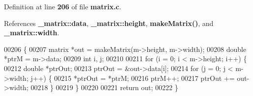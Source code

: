 Definition at line \textbf{ 206} of file \textbf{ matrix.\+c}.



References \textbf{ \+\_\+matrix\+::data}, \textbf{ \+\_\+matrix\+::height}, \textbf{ make\+Matrix()}, and \textbf{ \+\_\+matrix\+::width}.


\begin{DoxyCode}
00206                                    \{
00207   matrix *out = makeMatrix(m->height, m->width);
00208   \textcolor{keywordtype}{double} *ptrM = m->data;
00209   \textcolor{keywordtype}{int} i, j;
00210 
00211   \textcolor{keywordflow}{for} (i = 0; i < m->height; i++) \{
00212     \textcolor{keywordtype}{double} *ptrOut;
00213     ptrOut = &out->data[i];
00214     \textcolor{keywordflow}{for} (j = 0; j < m->width; j++) \{
00215       *ptrOut = *ptrM;
00216       ptrM++;
00217       ptrOut += out->width;
00218     \}
00219   \}
00220 
00221   \textcolor{keywordflow}{return} out;
00222 \}
\end{DoxyCode}
